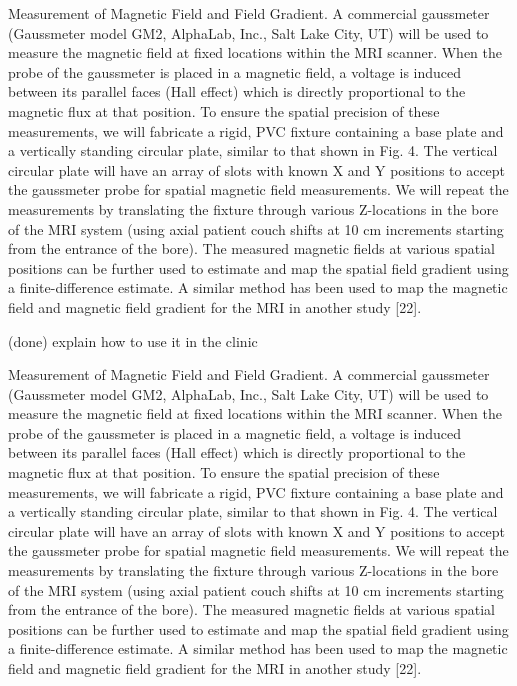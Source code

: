 Measurement of Magnetic Field and Field Gradient. A commercial
gaussmeter (Gaussmeter model GM2, AlphaLab, Inc., Salt Lake City,
UT) will be used to measure the magnetic field at fixed locations within
the MRI scanner. When the probe of the gaussmeter is placed in a
magnetic field, a voltage is induced between its parallel faces (Hall
effect) which is directly proportional to the magnetic flux at that
position. To ensure the spatial precision of these measurements, we will
fabricate a rigid, PVC fixture containing a base plate and a vertically
standing circular plate, similar to that shown in Fig. 4. The vertical circular plate will
have an array of slots with known X and Y positions to accept the gaussmeter probe for
spatial magnetic field measurements. We will repeat the measurements by translating the
fixture through various Z-locations in the bore of the MRI system (using axial patient
couch shifts at 10 cm increments starting from the entrance of the bore). The measured
magnetic fields at various spatial positions can be further used to estimate and map the
spatial field gradient using a finite-difference estimate. A similar method has been used
to map the magnetic field and magnetic field gradient for the MRI in another study [22].

(done) explain how to use it in the clinic

Measurement of Magnetic Field and Field Gradient. A commercial
gaussmeter (Gaussmeter model GM2, AlphaLab, Inc., Salt Lake City,
UT) will be used to measure the magnetic field at fixed locations within
the MRI scanner. When the probe of the gaussmeter is placed in a
magnetic field, a voltage is induced between its parallel faces (Hall
effect) which is directly proportional to the magnetic flux at that
position. To ensure the spatial precision of these measurements, we will
fabricate a rigid, PVC fixture containing a base plate and a vertically
standing circular plate, similar to that shown in Fig. 4. The vertical circular plate will
have an array of slots with known X and Y positions to accept the gaussmeter probe for
spatial magnetic field measurements. We will repeat the measurements by translating the
fixture through various Z-locations in the bore of the MRI system (using axial patient
couch shifts at 10 cm increments starting from the entrance of the bore). The measured
magnetic fields at various spatial positions can be further used to estimate and map the
spatial field gradient using a finite-difference estimate. A similar method has been used
to map the magnetic field and magnetic field gradient for the MRI in another study [22].

